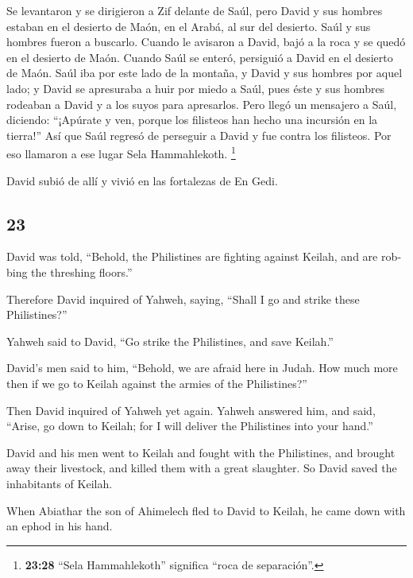 \begin{paracol}{2}
 Se levantaron y se dirigieron a Zif delante de Saúl,
pero David y sus hombres estaban en el desierto de Maón, en el Arabá, al
sur del desierto.  Saúl y sus hombres fueron a buscarlo.
Cuando le avisaron a David, bajó a la roca y se quedó en el desierto de
Maón. Cuando Saúl se enteró, persiguió a David en el desierto de Maón.
 Saúl iba por este lado de la montaña, y David y sus
hombres por aquel lado; y David se apresuraba a huir por miedo a Saúl,
pues éste y sus hombres rodeaban a David y a los suyos para apresarlos.
 Pero llegó un mensajero a Saúl, diciendo: ``¡Apúrate y
ven, porque los filisteos han hecho una incursión en la tierra!''
 Así que Saúl regresó de perseguir a David y fue contra
los filisteos. Por eso llamaron a ese lugar Sela Hammahlekoth.
\footnote{\textbf{23:28} ``Sela Hammahlekoth'' significa ``roca de
  separación''.}

 David subió de allí y vivió en las fortalezas de En
Gedi.

\switchcolumn
\begin{otherlanguage}{english}

\hypertarget{section-45}{%
\section{23}\label{section-45}}

 David was told, ``Behold, the Philistines are fighting
against Keilah, and are robbing the threshing floors.''

 Therefore David inquired of Yahweh, saying, ``Shall I go
and strike these Philistines?''

Yahweh said to David, ``Go strike the Philistines, and save Keilah.''

 David's men said to him, ``Behold, we are afraid here in
Judah. How much more then if we go to Keilah against the armies of the
Philistines?''

 Then David inquired of Yahweh yet again. Yahweh answered
him, and said, ``Arise, go down to Keilah; for I will deliver the
Philistines into your hand.''

 David and his men went to Keilah and fought with the
Philistines, and brought away their livestock, and killed them with a
great slaughter. So David saved the inhabitants of Keilah.

 When Abiathar the son of Ahimelech fled to David to
Keilah, he came down with an ephod in his hand.


\end{otherlanguage}
\end{paracol}
